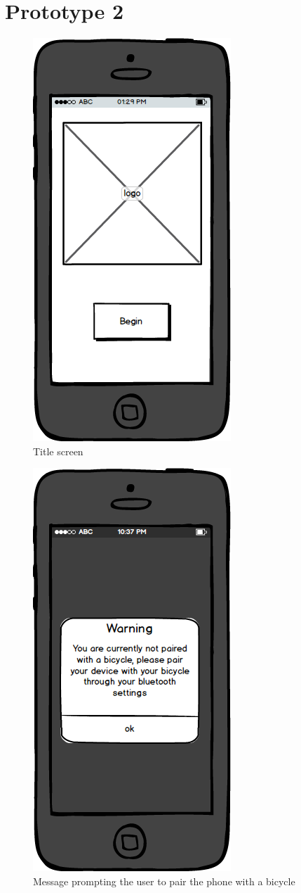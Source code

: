 \documentclass[a4paper]{report}
\begin{document}
\chapter{Prototype 2}
\begin{figure}
\centering
\includegraphics[scale=0.9]{figures/prototype_2/title}
\caption{Title screen}
\end{figure}
\clearpage
\begin{figure}
\centering
\includegraphics[scale=0.9]{figures/prototype_2/not_paired}
\caption{Message prompting the user to pair the phone with a bicycle}
\end{figure}
\end{document}
